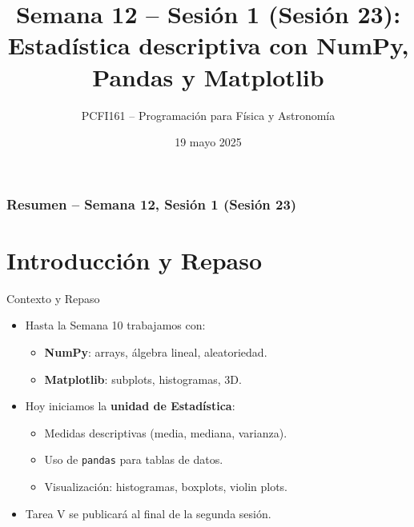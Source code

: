 \documentclass[10pt]{beamer}
\title{Semana 12 – Sesión 1 (Sesión 23): Estadística descriptiva con NumPy, Pandas y Matplotlib}
\author{PCFI161 – Programación para Física y Astronomía}
\date{19 mayo 2025}
\begin{document}
\myfront{}
\begin{frame}
  \titlepage
\end{frame}

\begin{frame}
  \frametitle{Resumen – Semana 12, Sesión 1 (Sesión 23)}
  \tableofcontents
\end{frame}


\section{Introducción y Repaso}
\begin{frame}{Contexto y Repaso}
  \begin{itemize}
    \item Hasta la Semana 10 trabajamos con:
      \begin{itemize}
        \item \textbf{NumPy}: arrays, álgebra lineal, aleatoriedad.
        \item \textbf{Matplotlib}: subplots, histogramas, 3D.
      \end{itemize}
    \item Hoy iniciamos la \textbf{unidad de Estadística}:
      \begin{itemize}
        \item Medidas descriptivas (media, mediana, varianza).
        \item Uso de \texttt{pandas} para tablas de datos.
        \item Visualización: histogramas, boxplots, violin plots.
      \end{itemize}
    \item \alert{Tarea V} se publicará al final de la segunda sesión.
  \end{itemize}
\end{frame}

\end{document}
